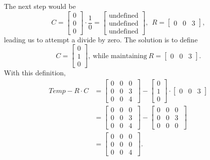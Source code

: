 The next step would be
$$C=  \left[\begin{array}{r} 0 \\ 0 \\ 0 \end{array} \right] \cdot \frac{1}{0} =\left[\begin{array}{r} \text{undefined} \\  \text{undefined} \\  \text{undefined} \end{array} \right] ,~~R=\left[\begin{array}{rrr} 0 & 0 & 3 \end{array} \right],$$
leading us to attempt a divide by zero. The solution is to define
$$C=  \left[\begin{array}{r} 0 \\ 1 \\ 0 \end{array} \right]  ,~\text{while maintaining}~R=\left[\begin{array}{rrr} 0 & 0 & 3 \end{array} \right].$$
With this definition, 
\begin{align*}
    Temp-R \cdot C &  =  \left[ \begin{array}{rrr} 0 & 0 & 0\\
 0 & 0& 3 \\0 &0 & 4  \end{array}\ \right] - \left[\begin{array}{r} 0 \\ 1 \\ 0 \end{array} \right] \cdot \left[\begin{array}{rrr} 0 & 0 & 3 \end{array} \right] \\
 &=  \left[ \begin{array}{rrr} 0 & 0 & 0\\
 0 & 0& 3 \\0 &0 & 4  \end{array}\ \right] -  \left[ \begin{array}{rrr} 0 & 0 & 0\\
 0 & 0& 3 \\0 &0 & 0  \end{array}\ \right]\\
 &=\left[ \begin{array}{rrr} 0 & 0 & 0\\
 0 & 0& 0 \\0 &0 & 4  \end{array}\ \right].
\end{align*}
